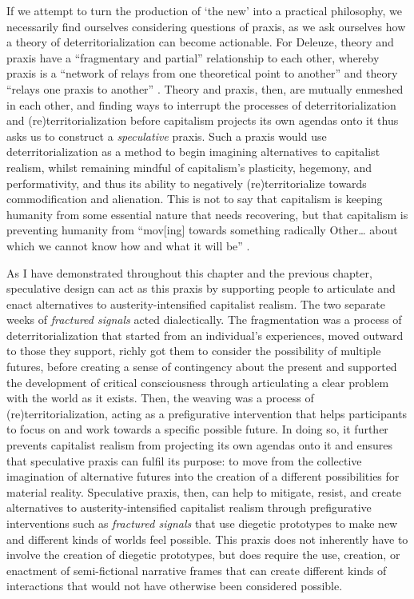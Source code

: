 If we attempt to turn the production of ‘the new' into a practical philosophy, we necessarily find ourselves considering questions of praxis, as we ask ourselves how a theory of deterritorialization can become actionable. For Deleuze, theory and praxis have a “fragmentary and partial” relationship to each other, whereby praxis is a “network of relays from one theoretical point to another” and theory “relays one praxis to another” \citep[206]{deleuze_desert_2004}. Theory and praxis, then, are mutually enmeshed in each other, and finding ways to interrupt the processes of deterritorialization and (re)territorialization before capitalism projects its own agendas onto it thus asks us to construct a \textit{speculative} praxis. Such a praxis would use deterritorialization as a method to begin imagining alternatives to capitalist realism, whilst remaining mindful of capitalism’s plasticity, hegemony, and performativity, and thus its ability to negatively (re)territorialize towards commodification and alienation. This is not to say that capitalism is keeping humanity from some essential nature that needs recovering, but that capitalism is preventing humanity from “mov[ing] towards something radically Other… about which we cannot know how and what it will be” \citep[121]{foucault_remarks_1991}. 

As I have demonstrated throughout this chapter and the previous chapter, speculative design can act as this praxis by supporting people to articulate and enact alternatives to austerity-intensified capitalist realism. The two separate weeks of \textit{fractured signals} acted dialectically. The fragmentation was a process of deterritorialization that started from an individual's experiences, moved outward to those they support, richly got them to consider the possibility of multiple futures, before creating a sense of contingency about the present and supported the development of critical consciousness through articulating a clear problem with the world as it exists. Then, the weaving was a process of (re)territorialization, acting as a prefigurative intervention that helps participants to focus on and work towards a specific possible future. In doing so, it further prevents capitalist realism from projecting its own agendas onto it and ensures that speculative praxis can fulfil its purpose: to move from the collective imagination of alternative futures into the creation of a different possibilities for material reality. Speculative praxis, then, can help to mitigate, resist, and create alternatives to austerity-intensified capitalist realism through prefigurative interventions such as \textit{fractured signals} that use diegetic prototypes to make new and different kinds of worlds feel possible. This praxis does not inherently have to involve the creation of diegetic prototypes, but does require the use, creation, or enactment of semi-fictional narrative frames that can create different kinds of interactions that would not have otherwise been considered possible. 

